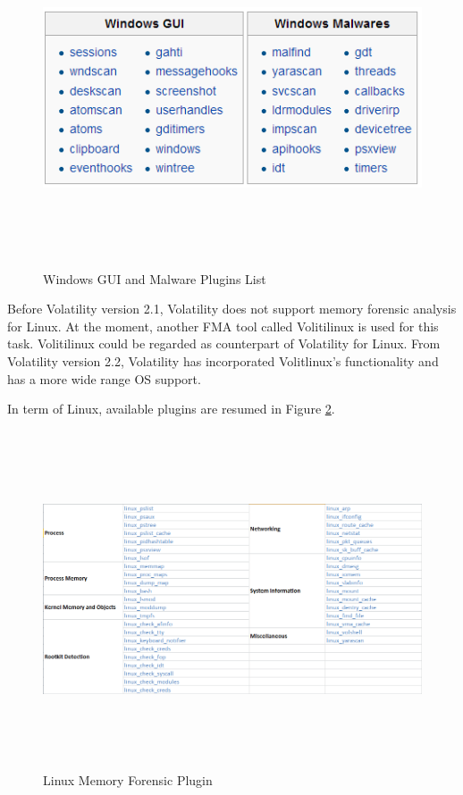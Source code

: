\begin{figure}[htbp]
	\centering
		\includegraphics[width=14cm, height= 10cm ]{Figures/Figure24.png}
	\caption[Windows GUI and Malware Plugins List]{Windows GUI and Malware Plugins List \cite{Reference13}}
	\label{fig:Windows GUI and Malware Plugins List}
\end{figure}

Before Volatility version 2.1, Volatility does not support memory forensic analysis for Linux. At the moment, another FMA tool called 
Volitilinux is used for this task. Volitilinux could be regarded as counterpart of Volatility for Linux. From Volatility version 2.2, 
Volatility has incorporated Volitlinux’s functionality and has a more wide range OS support.

In term of Linux, available plugins are resumed in Figure \ref{fig:Linux Memory Forensic Plugin}.
\begin{figure}[htbp]
	\centering
		\includegraphics[width=14cm, height= 10cm ]{Figures/Figure25.png}
	\caption[Linux Memory Forensic Plugin]{Linux Memory Forensic Plugin \cite{Reference36}}
	\label{fig:Linux Memory Forensic Plugin}
\end{figure}

